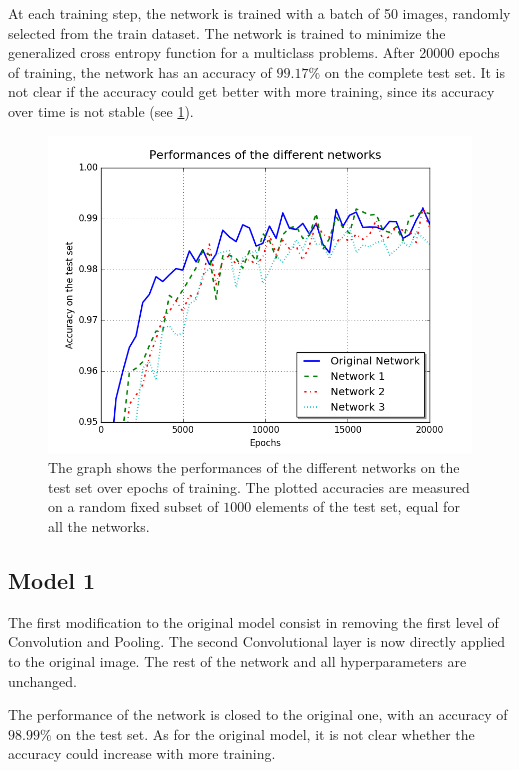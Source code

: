 At each training step, the network is trained with a batch of 50 images, randomly selected from the train dataset.
The network is trained to minimize the generalized cross entropy function for a multiclass problems.
After 20000 epochs of training, the network has an accuracy of $99.17\%$ on the complete test set.
It is not clear if the accuracy could get better with more training, since its accuracy over time is not stable (see \cref{fig:performances}).

\begin{figure}[t]
	\centering
	\includegraphics[width=\columnwidth]{figures/performances}
	\caption{The graph shows the performances of the different networks on the test set over epochs of training. The plotted accuracies are measured on a random fixed subset of $1000$ elements of the test set, equal for all the networks.}
	\label{fig:performances}
\end{figure}


\subsection{Model 1}

The first modification to the original model consist in removing the first level of Convolution and Pooling.
The second Convolutional layer is now directly applied to the original image.
The rest of the network and all hyperparameters are unchanged.

The performance of the network is closed to the original one, with an accuracy of $98.99\%$ on the test set.
As for the original model, it is not clear whether the accuracy could increase with more training. 


